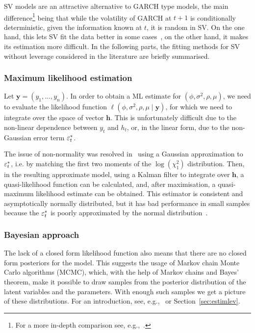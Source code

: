 SV models are an attractive alternative to GARCH type models, the main difference\footnote{For a more in-depth comparison see, e.g.,~\citet{Harvey1994}.} being that while the volatility of GARCH at $t+1$ is conditionally deterministic, given the information known at $t$, it is random in SV.
On the one hand, this lets SV fit the data better in some cases~\citep{Kim1998,Chan2016}, on the other hand, it makes its estimation more difficult. In the following parts, the fitting methods for SV without leverage considered in the literature are briefly summarised.

\subsubsection{Maximum likelihood estimation}

Let $\bm{y}=(y_1,\dots,y_n)$.
In order to obtain a ML estimate for $(\phi,\sigma^2,\rho,\mu)$, we need to evaluate the likelihood function $\ell(\phi,\sigma^2,\rho,\mu\mid\bm{y})$, for which we need to integrate over the space of vector $\bm{h}$.
This is unfortunately difficult due to the non-linear dependence between $y_t$ and $h_t$, or, in the linear form, due to the non-Gaussian error term $\varepsilon_t^\ast$.

The issue of non-normality was resolved in~\citet{Harvey1994} using a Gaussian approximation to $\varepsilon_t^\ast$, i.e. by matching the first two moments of the $\log(\chi_1^2)$ distribution.
Then, in the resulting approximate model, using a Kalman filter to integrate over $\bm{h}$, a quasi-likelihood function can be calculated, and, after maximisation, a quasi-maximum likelihood estimate can be obtained.
This estimator is consistent and asymptotically normally distributed, but it has bad performance in small samples because the $\varepsilon_t^\ast$ is poorly approximated by the normal distribution~\citep{Kim1998}.

\subsubsection{Bayesian approach}

The lack of a closed form likelihood function also means that there are no closed form posteriors for the model.
This suggests the usage of Markov chain Monte Carlo algorithms (MCMC), which, with the help of Markov chains and Bayes' theorem, make it possible to draw samples from the posterior distribution of the latent variables and the parameters.
With enough such samples we get a picture of these distributions.
For an introduction, see, e.g.,~\citet{Geyer2011} or Section~\ref{sec:estimlev}.

